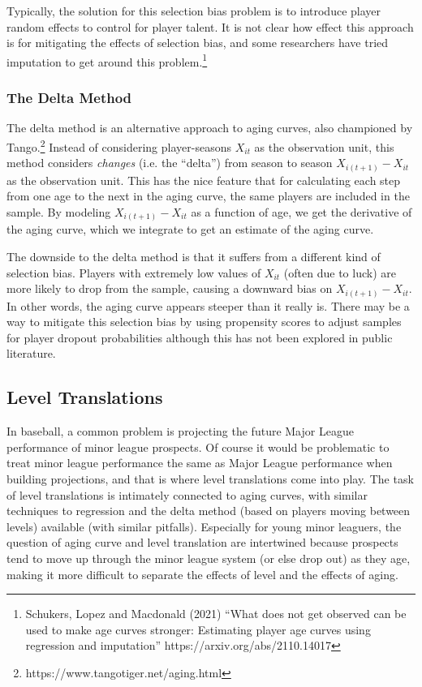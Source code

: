 \documentclass{article}
\begin{document}
        Typically, the solution for this selection bias problem is to introduce player random effects to control for player talent. It is not clear how effect this approach is for mitigating the effects of selection bias, and some researchers have tried imputation to get around this problem.\footnote{Schukers, Lopez and Macdonald (2021) ``What does not get observed can be used to make age curves stronger: Estimating player age curves using regression and imputation'' https://arxiv.org/abs/2110.14017}
  
      \subsubsection{\sc The Delta Method}
  
        The delta method is an alternative approach to aging curves, also championed by Tango.\footnote{https://www.tangotiger.net/aging.html} Instead of considering player-seasons $X_{it}$ as the observation unit, this method considers {\it changes} (i.e. the ``delta'') from season to season $X_{i(t+1)} - X_{it}$ as the observation unit. This has the nice feature that for calculating each step from one age to the next in the aging curve, the same players are included in the sample. By modeling $X_{i(t+1)} - X_{it}$ as a function of age, we get the derivative of the aging curve, which we integrate to get an estimate of the aging curve.
  
        The downside to the delta method is that it suffers from a different kind of selection bias. Players with extremely low values of $X_{it}$ (often due to luck) are more likely to drop from the sample, causing a downward bias on $X_{i(t+1)} - X_{it}$. In other words, the aging curve appears steeper than it really is. There may be a way to mitigate this selection bias by using propensity scores to adjust samples for player dropout probabilities although this has not been explored in public literature.
  
    \subsection{\sc Level Translations}
  
      In baseball, a common problem is projecting the future Major League performance of minor league prospects. Of course it would be problematic to treat minor league performance the same as Major League performance when building projections, and that is where level translations come into play. The task of level translations is intimately connected to aging curves, with similar techniques to regression and the delta method (based on players moving between levels) available (with similar pitfalls). Especially for young minor leaguers, the question of aging curve and level translation are intertwined because prospects tend to move up through the minor league system (or else drop out) as they age, making it more difficult to separate the effects of level and the effects of aging.
\end{document}
